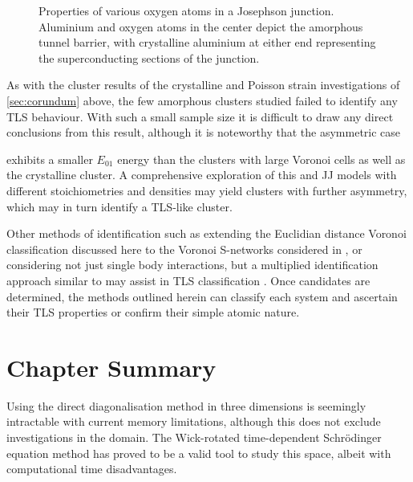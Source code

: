 \begin{figure}[htp]
\tlsjjmargins
\begin{adjustwidth}{\tlsjjleft}{\tlsjjright}
\resizebox{\widefigure}{!}{}
  \caption[Oxygen Properties in a Josephson Junction]{\label{fig:tlsinjj}Properties of various oxygen atoms in a Josephson junction. Aluminium  and oxygen  atoms in the center depict the amorphous tunnel barrier, with crystalline aluminium at either end representing the superconducting sections of the junction.}
\end{adjustwidth}
\end{figure}

As with the cluster results of the crystalline and Poisson strain investigations of \cref{sec:corundum} above, the few amorphous clusters studied failed to identify any TLS behaviour. 
With such a small sample size it is difficult to draw any direct conclusions from this result, although it is noteworthy that the asymmetric case  exhibits a smaller $E_{01}$ energy than the clusters with large Voronoi cells as well as the crystalline cluster.
A comprehensive exploration of this and JJ models with different stoichiometries and densities may yield clusters with further asymmetry, which may in turn identify a TLS-like cluster.

Other methods of identification such as extending the Euclidian distance Voronoi classification discussed here to the Voronoi S-networks considered in , or considering not just single body interactions, but a multiplied identification approach similar to \citeauthor{Paz2014} may assist in TLS classification \cite{Paz2014}.
Once candidates are determined, the methods outlined herein can classify each system and ascertain their TLS properties or confirm their simple atomic nature.

\section{Chapter Summary}\label{sec:summary3d}

Using the direct diagonalisation method in three dimensions is seemingly intractable with current memory limitations, although this does not exclude investigations in the  domain.
The Wick-rotated time-dependent Schrödinger equation method has proved to be a valid tool to study this space, albeit with computational time disadvantages.

